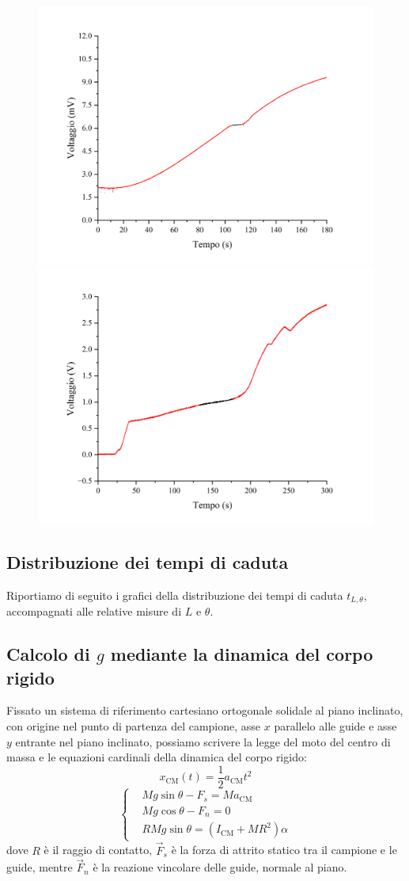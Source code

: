 \documentclass{article}
\begin{document}
\begin{figure}[H]
  \includegraphics[trim={1cm 0.6cm 1cm 1cm},clip,width=.49\textwidth]{img/indio.png}
  \includegraphics[trim={1cm 0.6cm 1cm 1cm},clip,width=.49\textwidth]{img/gallio.png}
\end{figure}

\subsection{Distribuzione dei tempi di caduta}

Riportiamo di seguito i grafici della distribuzione dei tempi di caduta $t_{L,\theta}$,
accompagnati alle relative misure di $L$ e $\theta$.

\begin{center}
\end{center}

\subsection{Calcolo di $g$ mediante la dinamica del corpo rigido}

Fissato un sistema di riferimento cartesiano ortogonale solidale
al piano inclinato, con origine nel punto di partenza del campione,
asse $x$ parallelo alle guide e asse $y$ entrante nel piano inclinato,
possiamo scrivere la legge del moto del centro di massa e le
equazioni cardinali della dinamica del corpo rigido:
\[x_\text{CM}(t) = \frac{1}{2} a_\text{CM} t^2\]
\[\left\{\begin{aligned}
    &M g \sin\theta - F_s = M a_\text{CM} \\
    &M g \cos\theta - F_n = 0 \\
    &R M g \sin\theta = \left(I_\text{CM} + M R^2\right) \alpha
\end{aligned}\right.\]
dove $R$ è il raggio di contatto, $\vec{F}_s$ è la forza di attrito statico
tra il campione e le guide, mentre $\vec{F}_n$ è la reazione vincolare delle
guide, normale al piano.
\end{document}
